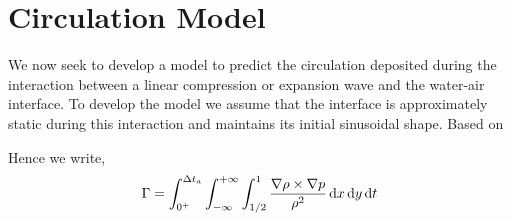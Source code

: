 \section*{Circulation Model}
We now seek to develop a model to predict the circulation deposited during the interaction between a linear compression or expansion wave and the water-air interface. To develop the model we assume that the interface is approximately static during this interaction and maintains its initial sinusoidal shape. Based on%

Hence we write,
\begin{align*}
\Gamma = \int_{0^+}^{\Delta t_a}\int_{-\infty}^{+\infty}\int_{1/2}^{1} \frac{\nabla \rho \times \nabla p}{\rho^2} \mathop{}\!\mathrm{d} x \mathop{}\!\mathrm{d} y \mathop{}\!\mathrm{d} t
\end{align*}


